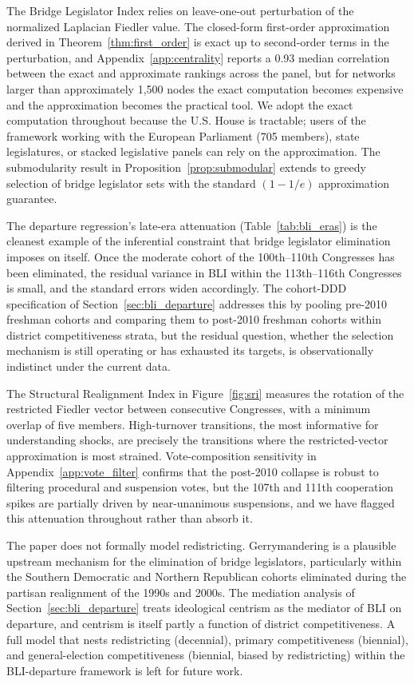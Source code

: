 \documentclass[12pt, a4paper]{article}
\begin{document}
The Bridge Legislator Index relies on leave-one-out perturbation of the normalized Laplacian Fiedler value. The closed-form first-order approximation derived in Theorem~\ref{thm:first_order} is exact up to second-order terms in the perturbation, and Appendix~\ref{app:centrality} reports a 0.93 median correlation between the exact and approximate rankings across the panel, but for networks larger than approximately 1{,}500 nodes the exact computation becomes expensive and the approximation becomes the practical tool. We adopt the exact computation throughout because the U.S. House is tractable; users of the framework working with the European Parliament (705 members), state legislatures, or stacked legislative panels can rely on the approximation. The submodularity result in Proposition~\ref{prop:submodular} extends to greedy selection of bridge legislator sets with the standard $(1 - 1/e)$ approximation guarantee.

The departure regression's late-era attenuation (Table~\ref{tab:bli_eras}) is the cleanest example of the inferential constraint that bridge legislator elimination imposes on itself. Once the moderate cohort of the 100th--110th Congresses has been eliminated, the residual variance in BLI within the 113th--116th Congresses is small, and the standard errors widen accordingly. The cohort-DDD specification of Section~\ref{sec:bli_departure} addresses this by pooling pre-2010 freshman cohorts and comparing them to post-2010 freshman cohorts within district competitiveness strata, but the residual question, whether the selection mechanism is still operating or has exhausted its targets, is observationally indistinct under the current data.

The Structural Realignment Index in Figure~\ref{fig:sri} measures the rotation of the restricted Fiedler vector between consecutive Congresses, with a minimum overlap of five members. High-turnover transitions, the most informative for understanding shocks, are precisely the transitions where the restricted-vector approximation is most strained. Vote-composition sensitivity in Appendix~\ref{app:vote_filter} confirms that the post-2010 collapse is robust to filtering procedural and suspension votes, but the 107th and 111th cooperation spikes are partially driven by near-unanimous suspensions, and we have flagged this attenuation throughout rather than absorb it.

The paper does not formally model redistricting. Gerrymandering is a plausible upstream mechanism for the elimination of bridge legislators, particularly within the Southern Democratic and Northern Republican cohorts eliminated during the partisan realignment of the 1990s and 2000s. The mediation analysis of Section~\ref{sec:bli_departure} treats ideological centrism as the mediator of BLI on departure, and centrism is itself partly a function of district competitiveness. A full model that nests redistricting (decennial), primary competitiveness (biennial), and general-election competitiveness (biennial, biased by redistricting) within the BLI-departure framework is left for future work.
\end{document}
